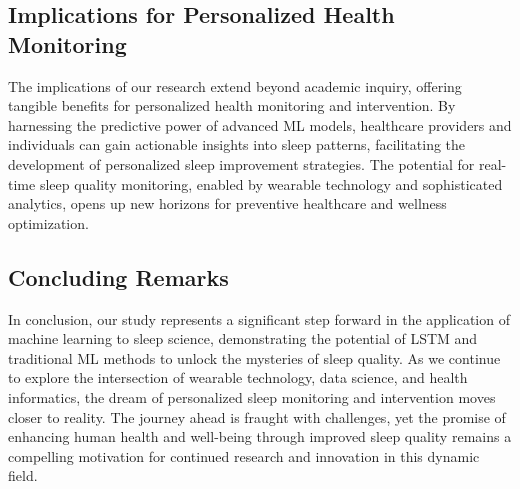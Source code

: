 \documentclass[10pt]{extarticle}
\begin{document}
\subsection{Implications for Personalized Health Monitoring}

The implications of our research extend beyond academic inquiry, offering tangible benefits for personalized health monitoring and intervention. By harnessing the predictive power of advanced ML models, healthcare providers and individuals can gain actionable insights into sleep patterns, facilitating the development of personalized sleep improvement strategies. The potential for real-time sleep quality monitoring, enabled by wearable technology and sophisticated analytics, opens up new horizons for preventive healthcare and wellness optimization.

\subsection{Concluding Remarks}

In conclusion, our study represents a significant step forward in the application of machine learning to sleep science, demonstrating the potential of LSTM and traditional ML methods to unlock the mysteries of sleep quality. As we continue to explore the intersection of wearable technology, data science, and health informatics, the dream of personalized sleep monitoring and intervention moves closer to reality. The journey ahead is fraught with challenges, yet the promise of enhancing human health and well-being through improved sleep quality remains a compelling motivation for continued research and innovation in this dynamic field.

\newpage

\printbibliography{}

\newpage
\end{document}
